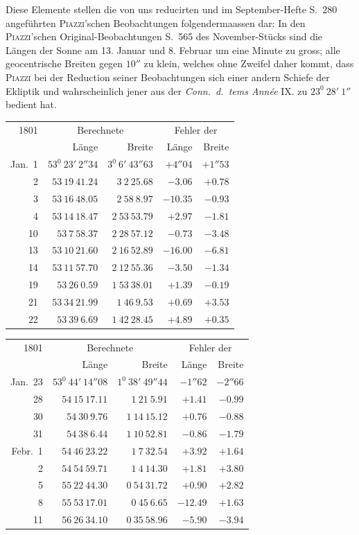 Diese Elemente stellen die von uns reducirten und im September-Hefte S.\ 280 angeführten \textsc{Piazzi}'schen Beobachtungen folgendermaassen dar:
\expandafter\def\csname HistoricalNoteText17\endcsname{In den \textsc{Piazzi}'schen Original-Beobachtungen S.\ 565 des November-Stücks sind die Längen der Sonne am 13. Januar und 8. Februar um eine Minute zu gross; alle geocentrische Breiten gegen $10''$ zu klein, welches ohne Zweifel daher kommt, dass \textsc{Piazzi} bei der Reduction seiner Beobachtungen sich einer andern Schiefe der Ekliptik und wahrscheinlich jener aus der \textit{Conn.\ d.\ tems Année} IX. zu $23^0\ 28'\ 1''$ bedient hat.}
%
\begin{center}
{\small\setlength{\tabcolsep}{4pt}
\begin{tabular}{r|r|r|r|r}
1801&\multicolumn{2}{c|}{Berechnete}&\multicolumn{2}{c}{Fehler der}\\
&Länge&Breite&Länge&Breite\\\hline
Jan.\ 1&$53^0\ 23'\ 2''34$&$3^0\ 6'\ 43''63$&$+4''04$&$+1''53$\\
2&$53\ 19\ 41.24$&$3\ 2\ 25.68$&$-3.06$&$+0.78$\\
3&$53\ 16\ 48.05$&$2\ 58\ 8.97$&$-10.35$&$-0.93$\\
4&$53\ 14\ 18.47$&$2\ 53\ 53.79$&$+2.97$&$-1.81$\\
10&$53\ 7\ 58.37$&$2\ 28\ 57.12$&$-0.73$&$-3.48$\\
13&$53\ 10\ 21.60$&$2\ 16\ 52.89$&$-16.00$&$-6.81$\\
14&$53\ 11\ 57.70$&$2\ 12\ 55.36$&$-3.50$&$-1.34$\\
19&$53\ 26\ 0.59$&$1\ 53\ 38.01$&$+1.39$&$-0.19$\\
21&$53\ 34\ 21.99$&$1\ 46\ 9.53$&$+0.69$&$+3.53$\\
22&$53\ 39\ 6.69$&$1\ 42\ 28.45$&$+4.89$&$+0.35$
\end{tabular}
\par\medskip
\begin{tabular}{r|r|r|r|r}
1801&\multicolumn{2}{c|}{Berechnete}&\multicolumn{2}{c}{Fehler der}\\
&Länge&Breite&Länge&Breite\\\hline
Jan.\ 23&$53^0\ 44'\ 14''08$&$1^0\ 38'\ 49''44$&$-1''62$&$-2''66$\\
28&$54\ 15\ 17.11$&$1\ 21\ 5.91$&$+1.41$&$-0.99$\\
30&$54\ 30\ 9.76$&$1\ 14\ 15.12$&$+0.76$&$-0.88$\\
31&$54\ 38\ 6.44$&$1\ 10\ 52.81$&$-0.86$&$-1.79$\\
Febr.\ 1&$54\ 46\ 23.22$&$1\ 7\ 32.54$&$+3.92$&$+1.64$\\
2&$54\ 54\ 59.71$&$1\ 4\ 14.30$&$+1.81$&$+3.80$\\
5&$55\ 22\ 44.30$&$0\ 54\ 31.72$&$+0.90$&$+2.82$\\
8&$55\ 53\ 17.01$&$0\ 45\ 6.65$&$-12.49$&$+1.63$\\
11&$56\ 26\ 34.10$&$0\ 35\ 58.96$&$-5.90$&$-3.94$
\end{tabular}}
\end{center}
